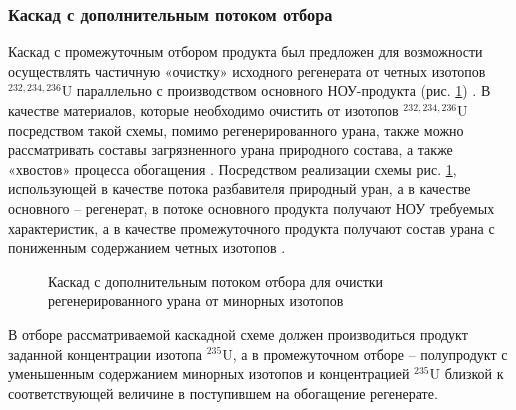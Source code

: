 \subsubsection{Каскад с дополнительным потоком отбора}

Каскад с промежуточным отбором продукта был предложен для возможности осуществлять частичную «очистку» исходного регенерата от четных изотопов $^{232,234,236}$U параллельно с производством основного НОУ-продукта (рис. \ref{fig:3_out}) \cite{zhurinSPOSOBPERERABOTKIZAGRYaZNENNOGO, palkinAnaliticheskiyRaschetSoderzhaniya2007}. В качестве материалов, которые необходимо очистить от изотопов $^{232,234,236}$U посредством такой схемы, помимо регенерированного урана, также можно рассматривать составы загрязненного урана природного состава, а также «хвостов» процесса обогащения \cite{palkinSeparationUraniumIsotopes2010}. Посредством реализации схемы рис. \ref{fig:3_out}, использующей в качестве потока разбавителя природный уран, а в качестве основного -- регенерат, в потоке основного продукта получают НОУ требуемых характеристик, а в качестве промежуточного продукта получают состав урана с пониженным содержанием четных изотопов \cite{palkinSeparationUraniumIsotopes2010}.
\begin{figure}[ht]
  \caption{Каскад с дополнительным потоком отбора для очистки регенерированного урана от минорных изотопов}\label{fig:3_out}
\end{figure}

В отборе рассматриваемой каскадной схеме должен производиться продукт заданной концентрации изотопа $^{235}$U, а в промежуточном отборе -- полупродукт с уменьшенным содержанием минорных изотопов и концентрацией $^{235}$U близкой к соответствующей величине в поступившем на обогащение регенерате.


